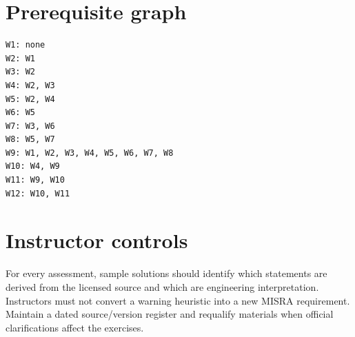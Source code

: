 \documentclass[10pt,letterpaper]{article}
\begin{document}
\section{Prerequisite graph}
\begin{lstlisting}[language={},caption={Directed dependency ordering; each line lists direct prerequisites}]
W1: none
W2: W1
W3: W2
W4: W2, W3
W5: W2, W4
W6: W5
W7: W3, W6
W8: W5, W7
W9: W1, W2, W3, W4, W5, W6, W7, W8
W10: W4, W9
W11: W9, W10
W12: W10, W11
\end{lstlisting}

\section{Instructor controls}
For every assessment, sample solutions should identify which statements are derived from the licensed source and which are engineering interpretation. Instructors must not convert a warning heuristic into a new MISRA requirement. Maintain a dated source/version register and requalify materials when official clarifications affect the exercises.
\end{document}
